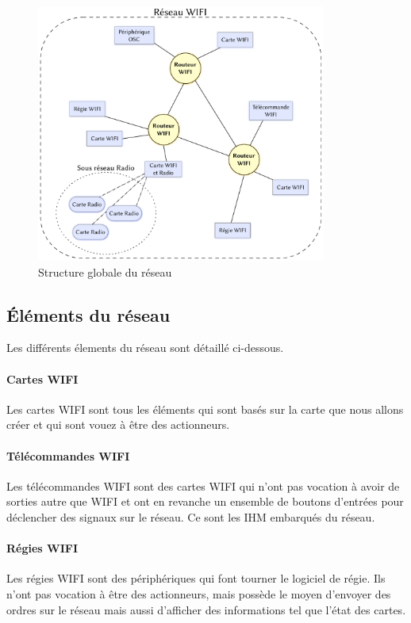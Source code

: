 \begin{figure}[htbp]
  \centering
  \includegraphics[width=0.85\textwidth]{figs/structure_reseau_global.pdf}
  \caption{Structure globale du réseau}
  \label{fig:structure_globale}
\end{figure}

\subsection{Éléments du réseau}
Les différents élements du réseau sont détaillé ci-dessous.

\paragraph{Cartes WIFI}\p
Les cartes WIFI sont tous les éléments qui sont basés sur la carte que nous allons créer et qui sont vouez à être des actionneurs.
\paragraph{Télécommandes WIFI}\p
Les télécommandes WIFI sont des cartes WIFI qui n'ont pas vocation à avoir de sorties autre que WIFI et ont en revanche un ensemble de boutons d'entrées pour déclencher des signaux sur le réseau. Ce sont les IHM embarqués du réseau.
\paragraph{Régies WIFI}\p
Les régies WIFI sont des périphériques qui font tourner le logiciel de régie. Ils n'ont pas vocation à être des actionneurs, mais possède le moyen d'envoyer des ordres sur le réseau mais aussi d'afficher des informations tel que l'état des cartes.
